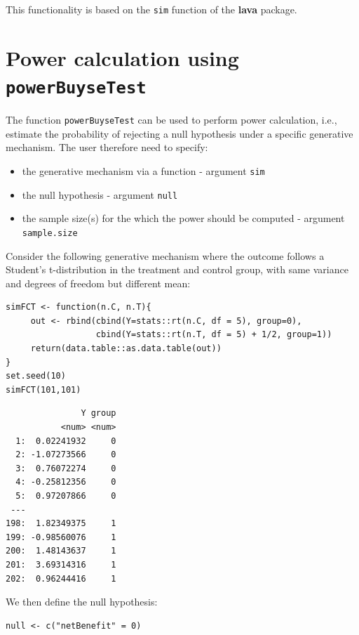 \documentclass[12pt]{article}
\begin{document}
This functionality is based on the \texttt{sim} function of the \textbf{lava}
package.

\clearpage

\section{Power calculation using \texttt{powerBuyseTest}}
\label{sec:org4eb20c6}

The function \texttt{powerBuyseTest} can be used to perform power
calculation, i.e., estimate the probability of rejecting a null
hypothesis under a specific generative mechanism. The user therefore
need to specify:
\begin{itemize}
\item the generative mechanism via a function \hfill - argument \texttt{sim}
\item the null hypothesis \hfill - argument \texttt{null}
\item the sample size(s) for the which the power should be computed  \hfill - argument \texttt{sample.size}
\end{itemize}

\bigskip

Consider the following generative mechanism where the outcome follows
a Student's t-distribution in the treatment and control group, with same
variance and degrees of freedom but different mean:
\lstset{language=r,label= ,caption= ,captionpos=b,numbers=none}
\begin{lstlisting}
simFCT <- function(n.C, n.T){
     out <- rbind(cbind(Y=stats::rt(n.C, df = 5), group=0),
                  cbind(Y=stats::rt(n.T, df = 5) + 1/2, group=1))
     return(data.table::as.data.table(out))
}
set.seed(10)
simFCT(101,101)
\end{lstlisting}

\begin{verbatim}
               Y group
           <num> <num>
  1:  0.02241932     0
  2: -1.07273566     0
  3:  0.76072274     0
  4: -0.25812356     0
  5:  0.97207866     0
 ---                  
198:  1.82349375     1
199: -0.98560076     1
200:  1.48143637     1
201:  3.69314316     1
202:  0.96244416     1
\end{verbatim}

We then define the null hypothesis:
\lstset{language=r,label= ,caption= ,captionpos=b,numbers=none}
\begin{lstlisting}
null <- c("netBenefit" = 0)
\end{lstlisting}
\end{document}
